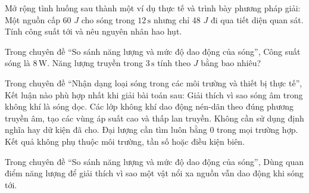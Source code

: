 \begin{ex}
Mở rộng tình huống sau thành một ví dụ thực tế và trình bày phương pháp giải: Một nguồn cấp 60 $J$ cho sóng trong $12\,\text{s}$ nhưng chỉ 48 $J$ đi qua tiết diện quan sát. Tính công suất tới và nêu nguyên nhân hao hụt.
\choiceTF

\end{ex}

\begin{ex}
Trong chuyên đề “So sánh năng lượng và mức độ dao động của sóng”, Công suất sóng là $8\,\text{W}$. Năng lượng truyền trong $3\,\text{s}$ tính theo $J$ bằng bao nhiêu?
\end{ex}

\begin{ex}
Trong chuyên đề “Nhận dạng loại sóng trong các môi trường và thiết bị thực tế”, Kết luận nào phù hợp nhất khi giải bài toán sau: Giải thích vì sao sóng âm trong không khí là sóng dọc.
\choice
{\True Các lớp không khí dao động nén-dãn theo đúng phương truyền âm, tạo các vùng áp suất cao và thấp lan truyền.}
{Không cần sử dụng định nghĩa hay dữ kiện đã cho.}
{Đại lượng cần tìm luôn bằng 0 trong mọi trường hợp.}
{Kết quả không phụ thuộc môi trường, tần số hoặc điều kiện biên.}
\end{ex}

\begin{ex}
Trong chuyên đề “So sánh năng lượng và mức độ dao động của sóng”, Dùng quan điểm năng lượng để giải thích vì sao một vật nổi xa nguồn vẫn dao động khi sóng tới.
\choiceTF

\end{ex}

